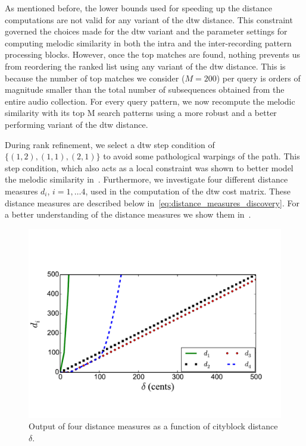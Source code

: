 As mentioned before, the lower bounds used for speeding up the distance computations are not valid for any variant of the \gls{dtw} distance. This constraint governed the choices made for the \gls{dtw} variant and the parameter settings for computing melodic similarity in both the intra and the inter-recording pattern processing blocks. However, once the top matches are found, nothing prevents us from reordering the ranked list using any variant of the \gls{dtw} distance. This is because the number of top matches we consider ($M=200$) per query is orders of magnitude smaller than the total number of subsequences obtained from the entire audio collection. For every query pattern, we now recompute the melodic similarity with its top M search patterns using a more robust and a better performing variant of the \gls{dtw} distance.

During rank refinement, we select a \gls{dtw} step condition of $\lbrace(1,2), (1,1), (2,1)\rbrace$ to avoid some pathological warpings of the path. This step condition, which also acts as a local constraint was shown to better model the melodic similarity in~. Furthermore, we investigate four different distance measures $d_i$, $i=1,\dots 4$, used in the computation of the \gls{dtw} cost matrix. These distance measures are described below in~\eqref{eq:distance_measures_discovery}. For a better understanding of the distance measures we show them in~.


\begin{figure}
	\begin{center}
		\includegraphics[width=\figSizeEightyFive]{ch06_patterns/figures/discovery/distances.pdf}
	\end{center}
	\caption{Output of four distance measures as a function of cityblock distance $\delta$. }
	\label{fig:Distances_DTW_discovery}
\end{figure}


